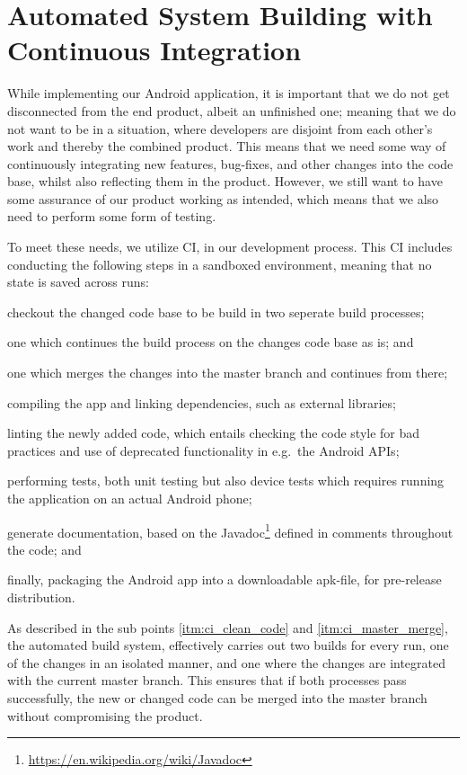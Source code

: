 \section{Automated System Building with Continuous Integration}\label{sec:ci}
While implementing our Android application, it is important that we do not get disconnected from the end product, albeit an unfinished one; meaning that we do not want to be in a situation, where developers are disjoint from each other's work and thereby the combined product.
This means that we need some way of continuously integrating new features, bug-fixes, and other changes into the code base, whilst also reflecting them in the product.
However, we still want to have some assurance of our product working as intended, which means that we also need to perform some form of testing.

\bigskip
To meet these needs, we utilize \ac{CI}, in our development process.
This \ac{CI} includes conducting the following steps in a sandboxed environment, meaning that no state is saved across runs:
\begin{enumberate}
\item checkout the changed code base to be build in two seperate build processes;
\begin{enumberate}
    \item one which continues the build process on the changes code base as is; and\label{itm:ci_clean_code}
    \item one which merges the changes into the master branch and continues from there;\label{itm:ci_master_merge}
\end{enumberate}
\item compiling the app and linking dependencies, such as external libraries;
\item linting the newly added code, which entails checking the code style for bad practices and use of deprecated functionality in e.g.~the Android APIs;
\item performing tests, both unit testing but also device tests which requires running the application on an actual Android phone;
\item generate documentation, based on the Javadoc\footnote{\url{https://en.wikipedia.org/wiki/Javadoc}} defined in comments throughout the code; and
\item finally, packaging the Android app into a downloadable apk-file, for pre-release distribution.
\end{enumberate}
As described in the sub points \ref{itm:ci_clean_code} and \ref{itm:ci_master_merge}, the automated build system, effectively carries out two builds for every run, one of the changes in an isolated manner, and one where the changes are integrated with the current master branch.
This ensures that if both processes pass successfully, the new or changed code can be merged into the master branch without compromising the product.

